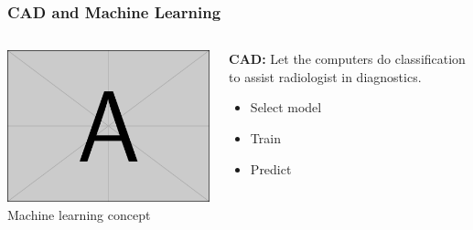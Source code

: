 \documentclass[aspectratio=1610]{beamer}
\begin{document}
\begin{frame}
  \frametitle{\hfill CAD and Machine Learning}
  \begin{columns}[T]
    \begin{column}{.5\textwidth}
      \begin{block}{}
        \includegraphics[width=\textwidth]{images/example-image-a.png}\\
        Machine learning concept
      \end{block}
    \end{column}
    \begin{column}{.5\textwidth}
      \begin{block}{}
        \textbf{CAD:} Let the computers do classification to assist radiologist in diagnostics.
        \begin{itemize}
          \item Select model\pause
          \item Train\pause
          \item Predict\pause
        \end{itemize}
      \end{block}
    \end{column}
  \end{columns}
\end{frame}
\end{document}
